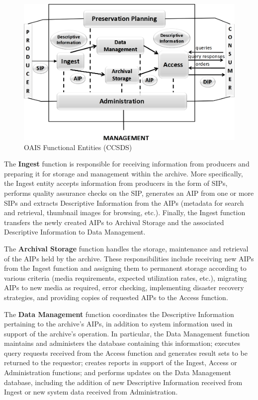 \begin{figure}[h]
\centering\includegraphics[scale=0.35]{fig/oais_functional_entities}
\caption{OAIS Functional Entities (CCSDS)}
\label{fig:OAIS Functional Entities}
\end{figure}

The \textbf{Ingest} function is responsible for receiving information from producers and preparing it for storage and management within the archive. More specifically, the Ingest entity accepts information from producers in the form of SIPs, performs quality assurance checks on the SIP, generates an AIP from one or more SIPs and extracts Descriptive Information from the AIPs (metadata for search and retrieval, thumbnail images for browsing, etc.). Finally, the Ingest function transfers the newly created AIPs to Archival Storage and the associated Descriptive Information to Data Management.

The \textbf{Archival Storage} function handles the storage, maintenance and retrieval of the AIPs held by the archive. These responsibilities include receiving new AIPs from the Ingest function and assigning them to permanent storage according to various criteria (media requirements, expected utilization rates, etc.), migrating AIPs to new media as required, error checking, implementing disaster recovery strategies, and providing copies of requested AIPs to the Access function.

The \textbf{Data Management} function coordinates the Descriptive Information pertaining to the archive's AIPs, in addition to system information used in support of the archive's operation. In particular, the Data Management function maintains and administers the database containing this information; executes query requests received from the Access function and generates result sets to be returned to the requestor; creates reports in support of the Ingest, Access or Administration functions; and performs updates on the Data Management database, including the addition of new Descriptive Information received from Ingest or new system data received from Administration.

